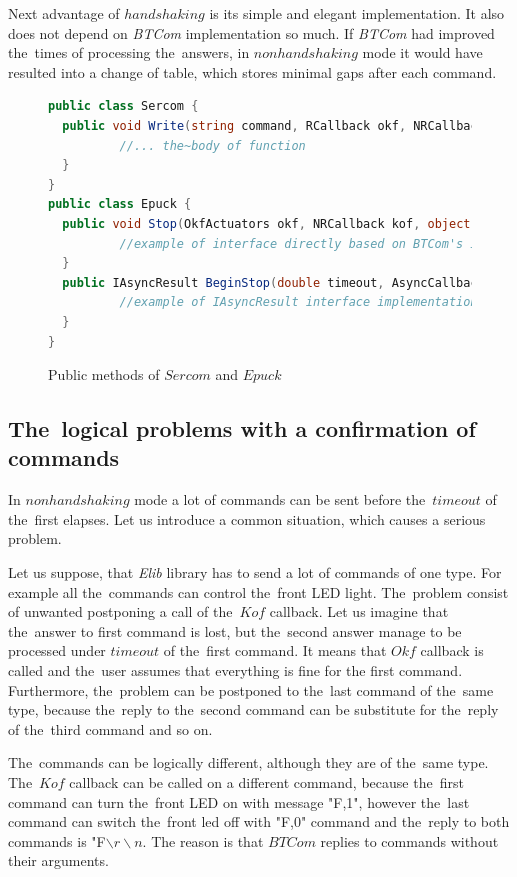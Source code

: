   Next advantage of $handshaking$ is its simple and elegant implementation. It also does not depend on {\it BTCom} implementation so much.
  If {\it BTCom} had improved the~times of processing the~answers,
  in $nonhandshaking$ mode it would have resulted into a change of table, which stores minimal gaps after each command.

\begin{figure}[!hbp]
\begin{lstlisting}[language=cs]
public class Sercom {
  public void Write(string command, RCallback okf, NRCallback kof,object state, double timeout) {
          //... the~body of function
  }
}
public class Epuck {
  public void Stop(OkfActuators okf, NRCallback kof, object state, double timeout) {
          //example of interface directly based on BTCom's interface
  }
  public IAsyncResult BeginStop(double timeout, AsyncCallback callback, Object state) {
          //example of IAsyncResult interface implementation
  }
}
\end{lstlisting}
\caption{Public methods of $Sercom$ and $Epuck$} \label{serep}
\end{figure}

 \subsection{The~logical problems with a confirmation of commands}\label{sec:logical}
  In $nonhandshaking$ mode a lot of commands can be sent before the~$timeout$ of the~first elapses.
  Let us introduce a common situation, which causes a serious problem. 
  
  Let us suppose, that {\it Elib} library has to send a lot of commands of one type.
  For example all the~commands can control the~front LED light.	
  The~problem consist of unwanted postponing a call of the~$Kof$ callback. 
  Let us imagine that the~answer to first command
  is lost, but the~second answer manage to be processed under $timeout$ of the~first command.
  It means that $Okf$ callback is called and the~user assumes that everything is fine for the first command.
  Furthermore, the~problem can be postponed to the~last command of the~same type,
  because the~reply to the~second command can be substitute for the~reply of the~third command
  and so on.

  The~commands can be logically different, although they are of the~same type.
  The~$Kof$ callback can be called on a different command, because the~first command can turn the~front LED on 
  with message "F,1", however the~last command can switch the~front led off with "F,0" command and 
  the~reply to both commands is "F$\backslash r\backslash n$. The reason is that $BTCom$ replies to commands without
  their arguments.

